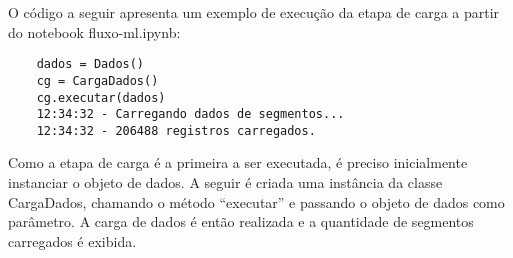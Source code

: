 O código a seguir apresenta um exemplo de execução da etapa de carga a partir do notebook fluxo-ml.ipynb: 

\begin{lstlisting}
	dados = Dados()
	cg = CargaDados()
	cg.executar(dados)
	12:34:32 - Carregando dados de segmentos...
	12:34:32 - 206488 registros carregados.
\end{lstlisting}

Como a etapa de carga é a primeira a ser executada, é preciso inicialmente instanciar o objeto de dados. A seguir é criada uma instância da classe CargaDados, chamando o método ``executar'' e passando o objeto de dados como parâmetro. A carga de dados é então realizada e a quantidade de segmentos carregados é exibida. 


